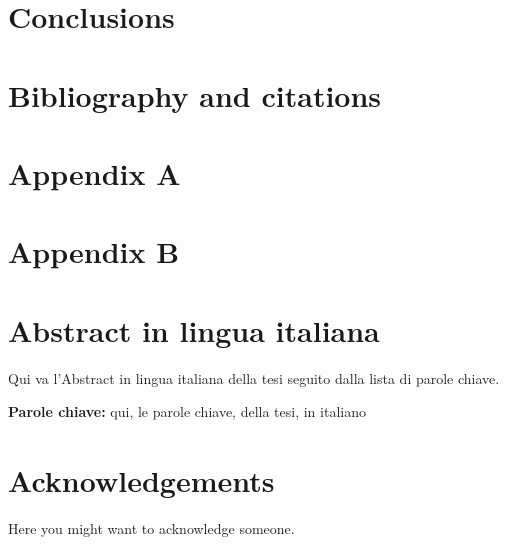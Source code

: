 \documentclass[11pt,a4paper]{article}
\begin{document}
\section{Conclusions}
\label{sec:conclusions}
\color{black}

\section{Bibliography and citations}



\appendix
\section{Appendix A}

\section{Appendix B}

\cleardoublepage

\section*{Abstract in lingua italiana}
Qui va l'Abstract in lingua italiana della tesi seguito dalla lista di parole chiave.
\vspace{15pt}
\begin{tcolorbox}[arc=0pt, boxrule=0pt, colback=bluePoli!60, width=\textwidth, colupper=white]
    \textbf{Parole chiave:} qui, le parole chiave, della tesi, in italiano 
\end{tcolorbox}

\section*{Acknowledgements}
Here you might want to acknowledge someone.

\end{document}
